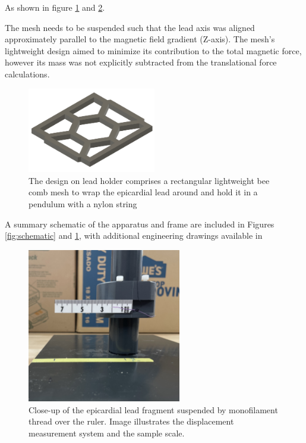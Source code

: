 As shown in figure \ref{fig:leadHolder} and \ref{fig:leadcloseup}.

The mesh needs to be suspended such that the lead axis was aligned approximately parallel to the magnetic field gradient (Z-axis). The mesh's lightweight design aimed to minimize its contribution to the total magnetic force, however its mass was not explicitly subtracted from the translational force calculations.

\begin{figure}[H]
	\centering
	\includegraphics[width=0.5\textwidth]{Assests/frameHolder.png}
	\caption[3D render of the design on lead holder]{The design on lead holder comprises a rectangular lightweight bee comb mesh to wrap the epicardial lead around and hold it in a pendulum with a nylon string}	
	\label{fig:leadHolder}
\end{figure}

A summary schematic of the apparatus and frame are included in Figures \ref{fig:schematic} and \ref{fig:leadHolder}, with additional engineering drawings available in %



\begin{figure}[H]
	\centering
	\includegraphics[width=0.6\textwidth]{Assests/Picture2.jpg}
	\caption{Close-up of the epicardial lead fragment suspended by monofilament thread over the ruler. Image illustrates the displacement measurement system and the sample scale.}
	\label{fig:leadcloseup}
\end{figure}

